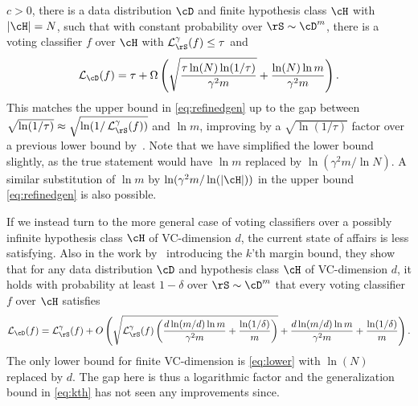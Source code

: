 $c>0$, there is a data distribution $\cD$ and finite hypothesis class
$\cH$ with $|\cH|=N$, such that with constant probability over $\rS
\sim \cD^m$, there is a voting classifier $f$ over $\cH$ with
$\ls^\gamma_{\rS}(f) \leq \tau$ and
\begin{align}
  \ls_{\cD}(f) = \tau + \Omega\left(\sqrt{\frac{\tau \ln(N)
  \ln(1/\tau) }{\gamma^2 m}} +\frac{\ln(N) \ln m}{\gamma^2 m}\right). \label{eq:lower}
\end{align}
This matches the upper bound in \cref{eq:refinedgen} up to the gap
between $\sqrt{\ln(1/\tau)} \approx \sqrt{\ln(1/\ls^\gamma_{\rS}(f))}$ and
$\ln m$, improving by a $\sqrt{\ln(1/\tau)}$ factor over a previous
lower bound by~\cite{DBLP:conf/nips/GronlundKLMN19}. Note that we have simplified the lower bound slightly, as the
true statement would have $\ln m$ replaced by $\ln(\gamma^2
m/\ln N)$. A similar substitution of $\ln m$ by $\ln(\gamma^2
m/\ln(|\cH|))$ in the upper bound \cref{eq:refinedgen} is also possible.

If we instead turn to the more general case of voting classifiers over
a possibly infinite hypothesis class $\cH$ of VC-dimension $d$, the
current state of affairs is less satisfying. Also in the work
by~\cite{GAO20131} introducing the $k$'th margin bound, they show that for any
data distribution $\cD$ and hypothesis class
$\cH$ of VC-dimension $d$, it holds with probability at least
$1-\delta$ over $\rS \sim \cD^m$ that every voting classifier $f$ over
$\cH$ satisfies
\begin{align}
\ls_{\cD}(f) = \ls_{\rS}^\gamma(f) +
  O\left(\sqrt{\ls_{\rS}^\gamma(f) \left(\frac{d \ln(m/d) \ln m}{\gamma^{2} 
  m} + \frac{\ln(1/\delta)}{m} \right)}+\frac{ d \ln(m/d) \ln m}{\gamma^{2} m}+\frac{\ln(1/\delta)}{m}\right). \label{eq:kth}
\end{align}
The only lower bound for finite VC-dimension is \cref{eq:lower} with
$\ln(N)$ replaced by $d$. The gap here is thus a logarithmic
factor and the generalization bound in \cref{eq:kth} has not seen any
improvements since.

